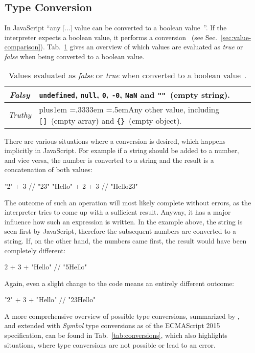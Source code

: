 \subsection{Type Conversion}
\label{sec:type-conversion}

In JavaScript ``any [...] value can be converted to a boolean value~\cite[p.~40]{JavaScriptTheDefinitiveGuide:Flanagan:2011}''. If the interpreter expects a boolean value, it performs a conversion~\cite[p.~46]{JavaScriptTheDefinitiveGuide:Flanagan:2011} (see Sec.~\ref{sec:value-comparison}). Tab.~\ref{tab:truthy-falsy} gives an overview of which values are evaluated as \emph{true} or \emph{false} when being converted to a boolean value.
\begin{table}
\caption{Values evaluated as \emph{false} or \emph{true} when converted to a boolean value~\cite[p.~40]{JavaScriptTheDefinitiveGuide:Flanagan:2011}.}\label{tab:truthy-falsy}
\centering
  \def\rr{\rightskip=0pt plus1em \spaceskip=.3333em \xspaceskip=.5em\relax}
  \setlength{\tabcolsep}{1ex}
  \def\arraystretch{1.20}
  \setlength{\tabcolsep}{1ex}
  \small
  \begin{tabular}{|c||l|}
    \hline
    \emph{Falsy} & \texttt{undefined}, \texttt{null}, \texttt{0}, \texttt{-0}, \texttt{NaN} and \texttt{""}~(empty string). \\
    \hline
    \emph{Truthy} & {\rr Any other value, including \texttt{[]}~(empty array) and \texttt{\{\}}~(empty object). } \\
    \hline
  \end{tabular}
\end{table}
There are various situations where a conversion is desired, which happens implicitly in JavaScript. For example if a string should be added to a number, and vice versa, the number is converted to a string and the result is a concatenation of both values:
\begin{JsCode}[numbers=none]
"2" + 3 // "23"
"Hello" + 2 + 3 // "Hello23"
\end{JsCode}
The outcome of such an operation will most likely complete without errors, as the interpreter tries to come up with a sufficient result. Anyway, it has a major influence how such an expression is written. In the example above, the string is seen first by JavaScript, therefore the subsequent numbers are converted to a string. If, on the other hand, the numbers came first, the result would have been completely different:
\begin{JsCode}[numbers=none]
2 + 3 + "Hello" // "5Hello"
\end{JsCode}
Again, even a slight change to the code means an entirely different outcome:
\begin{JsCode}[numbers=none]
"2" + 3 + "Hello" // "23Hello"
\end{JsCode}
A more comprehensive overview of possible type conversions, summarized by \citeauthor{JavaScriptTheDefinitiveGuide:Flanagan:2011}, and extended with \emph{Symbol} type conversions as of the ECMAScript 2015 specification, can be found in Tab.~\ref{tab:conversions}, which also highlights situations, where type conversions are not possible or lead to an error.

